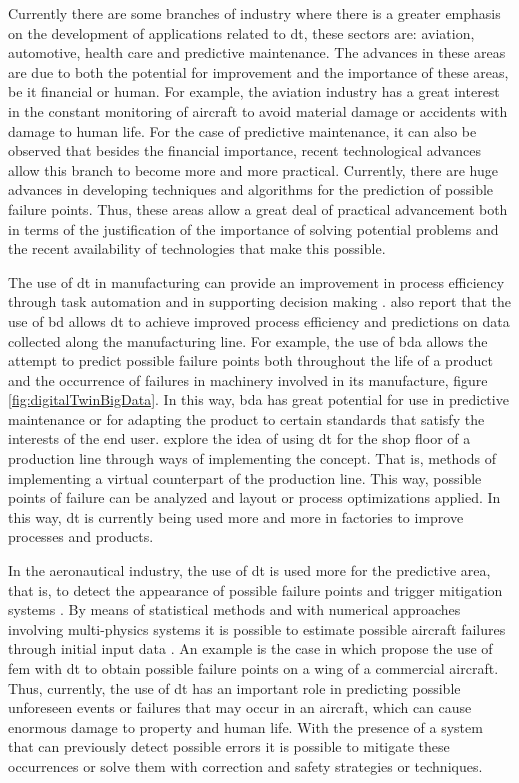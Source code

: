   
Currently there are some branches of industry where there is a greater emphasis on the development of applications related to \acrshort{dt}, these sectors are: aviation, automotive, health care and predictive maintenance. The advances in these areas are due to both the potential for improvement and the importance of these areas, be it financial or human. For example, the aviation industry has a great interest in the constant monitoring of aircraft to avoid material damage or accidents with damage to human life. For the case of predictive maintenance, it can also be observed that besides the financial importance, recent technological advances allow this branch to become more and more practical. Currently, there are huge advances in developing techniques and algorithms for the prediction of possible failure points. Thus, these areas allow a great deal of practical advancement both in terms of the justification of the importance of solving potential problems and the recent availability of technologies that make this possible.  



The use of \acrshort{dt} in manufacturing can provide an improvement in process efficiency through task automation and in supporting decision making \cite{ROSEN2015567}. \textcite{Qi2018} also report that the use of \acrfull{bd} allows \acrshort{dt} to achieve improved process efficiency and predictions on data collected along the manufacturing line. For example, the use of \acrshort{bda} allows the attempt to predict possible failure points both throughout the life of a product and the occurrence of failures in machinery involved in its manufacture, figure \ref{fig:digitalTwinBigData}. In this way, \acrshort{bda} has great potential for use in predictive maintenance or for adapting the product to certain standards that satisfy the interests of the end user. \textcite{Tao2017} explore the idea of using \acrshort{dt} for the shop floor of a production line through ways of implementing the concept. That is, methods of implementing a virtual counterpart of the production line. This way, possible points of failure can be analyzed and layout or process optimizations applied. In this way, \acrshort{dt} is currently being used more and more in factories to improve processes and products.

In the aeronautical industry, the use of \acrshort{dt} is used more for the predictive area, that is, to detect the appearance of possible failure points and trigger mitigation systems \cite{Barricelli2019}. By means of statistical methods and with numerical approaches involving multi-physics systems it is possible to estimate possible aircraft failures through initial input data \cite{Benjamin2012}. An example is the case in which \textcite{Bielefeldt2015} propose the use of \acrlong{fem} with \acrshort{dt} to obtain possible failure points on a wing of a commercial aircraft. Thus, currently, the use of \acrshort{dt} has an important role in predicting possible unforeseen events or failures that may occur in an aircraft, which can cause enormous damage to property and human life. With the presence of a system that can previously detect possible errors it is possible to mitigate these occurrences or solve them with correction and safety strategies or techniques. 

